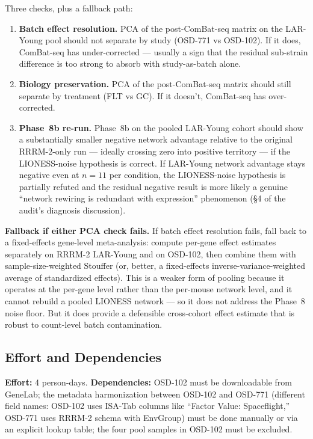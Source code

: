 \documentclass[11pt]{article}
\begin{document}
Three checks, plus a fallback path:

\begin{enumerate}[leftmargin=*]
\item \textbf{Batch effect resolution.} PCA of the post-ComBat-seq matrix on the LAR-Young pool should not separate by study (OSD-771 vs OSD-102). If it does, ComBat-seq has under-corrected --- usually a sign that the residual sub-strain difference is too strong to absorb with study-as-batch alone.
\item \textbf{Biology preservation.} PCA of the post-ComBat-seq matrix should still separate by treatment (FLT vs GC). If it doesn't, ComBat-seq has over-corrected.
\item \textbf{Phase~8b re-run.} Phase~8b on the pooled LAR-Young cohort should show a substantially smaller negative network advantage relative to the original RRRM-2-only run --- ideally crossing zero into positive territory --- if the LIONESS-noise hypothesis is correct. If LAR-Young network advantage stays negative even at $n{=}11$ per condition, the LIONESS-noise hypothesis is partially refuted and the residual negative result is more likely a genuine ``network rewiring is redundant with expression'' phenomenon (\S 4 of the audit's diagnosis discussion).
\end{enumerate}

\textbf{Fallback if either PCA check fails.} If batch effect resolution fails, fall back to a fixed-effects gene-level meta-analysis: compute per-gene effect estimates separately on RRRM-2 LAR-Young and on OSD-102, then combine them with sample-size-weighted Stouffer (or, better, a fixed-effects inverse-variance-weighted average of standardized effects). This is a weaker form of pooling because it operates at the per-gene level rather than the per-mouse network level, and it cannot rebuild a pooled LIONESS network --- so it does not address the Phase~8 noise floor. But it does provide a defensible cross-cohort effect estimate that is robust to count-level batch contamination.

\subsection{Effort and Dependencies}

\textbf{Effort:} 4 person-days. \textbf{Dependencies:} OSD-102 must be downloadable from GeneLab; the metadata harmonization between OSD-102 and OSD-771 (different field names: OSD-102 uses ISA-Tab columns like ``Factor Value: Spaceflight,'' OSD-771 uses RRRM-2 schema with EnvGroup) must be done manually or via an explicit lookup table; the four pool samples in OSD-102 must be excluded.
\end{document}
